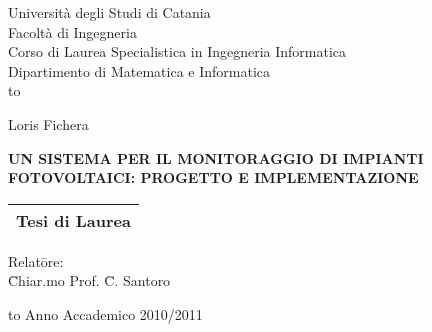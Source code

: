 \begin{titlepage}
\begin{center}
  {\Large \sc Universit\`a degli Studi di Catania}\\
  {\large \sc Facolt\`a di Ingegneria}\\
  {\sc Corso di Laurea Specialistica in Ingegneria Informatica}\\
  {\sc Dipartimento di Matematica e Informatica}\\
  
  \hbox to \textwidth{\hrulefill}
  
  \vspace{1.8truecm}
  
  {\large \sc Loris Fichera}
  
  \vspace{1.8truecm}
  
  {\large\sc \uppercase{\textbf{UN SISTEMA PER IL MONITORAGGIO DI IMPIANTI FOTOVOLTAICI: PROGETTO E IMPLEMENTAZIONE}}} %
  
  \vspace{1.7truecm}
  
  \begin{tabular}{c}
    \hline
        {\sc Tesi di Laurea}\\
        \hline
  \end{tabular}

  \vspace{1.7truecm}
  
  \begin{minipage}{\textwidth}
    \begin{flushright}
      \begin{minipage}{0.3\textwidth}
        \begin{tabbing}
          Relat\=ore:\\
          \>  \=Chiar.mo Prof. \= {\sc C. Santoro}
        \end{tabbing}
      \end{minipage}
    \end{flushright}
  \end{minipage}
  
  
  \hbox to \textwidth{\hrulefill}
        {\sc Anno Accademico 2010/2011}        
\end{center}
\end{titlepage}

\endinput
